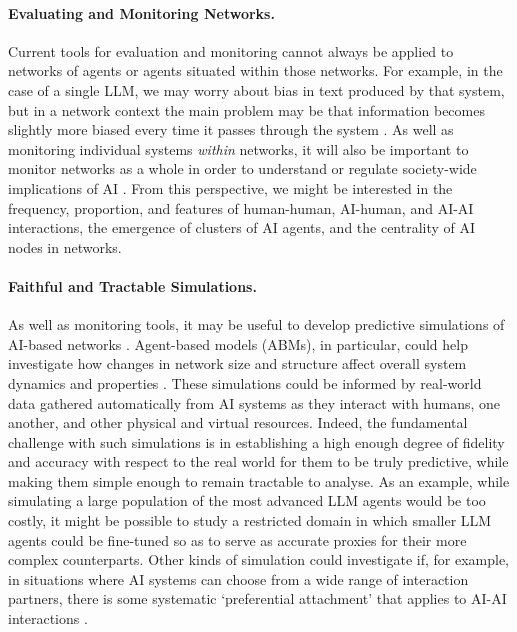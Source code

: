 \paragraph{Evaluating and Monitoring Networks.}
Current tools for evaluation and monitoring cannot always be applied to networks of agents or agents situated within those networks. 
For example, in the case of a single LLM, we may worry about bias in text produced by that system, but in a network context the main problem may be that information becomes slightly more biased every time it passes through the system \citep{Acerbi2023, laurito2024aiaibiaslarge}.
As well as monitoring individual systems \emph{within} networks, it will also be important to monitor networks as a whole in order to understand or regulate society-wide implications of AI \citep{Bommasani2023,dai2025individualexperiencecollectiveevidence}.
From this perspective, we might be interested in the frequency, proportion, and features of human-human, AI-human, and AI-AI interactions, the emergence of clusters of AI agents, and the centrality of AI nodes in networks.

\paragraph{Faithful and Tractable Simulations.}
As well as monitoring tools, it may be useful to develop predictive {simulations} of AI-based networks \citep{vezhnevets2023generative,FernandesSL2020,turner2025network}.
Agent-based models (ABMs), in particular, could help investigate how changes in network size and structure affect overall system dynamics and properties \citep{Fontana2015FromAM,ResndizBenhumea2019ApplyingSN,Xia2012StructuralEI,vestad_survey_2024}. These simulations could be informed by real-world data gathered automatically from AI systems as they interact with humans, one another, and other physical and virtual resources.
Indeed, the fundamental challenge with such simulations is in establishing a high enough degree of fidelity and accuracy with respect to the real world for them to be truly predictive, while making them simple enough to remain tractable to analyse.
As an example, while simulating a large population of the most advanced LLM agents would be too costly, it might be possible to study a restricted domain in which smaller LLM agents could be fine-tuned so as to serve as accurate proxies for their more complex counterparts.
Other kinds of simulation could investigate if, for example, in situations where AI systems can choose from a wide range of interaction partners, there is some systematic `preferential attachment' that applies to AI-AI interactions \citep[see also ]{Liu2024,Panickssery2024,Goel2025,laurito2024aiaibiaslarge}.

